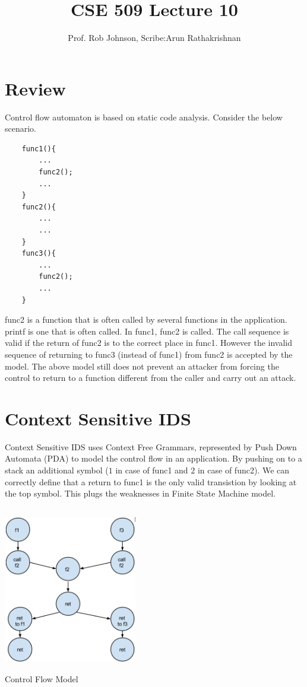 \documentclass[11pt]{article} %
\title{CSE 509 Lecture 10}
\author{Prof. Rob Johnson, Scribe:Arun Rathakrishnan}
\begin{document}
\maketitle
\section {Review}
Control flow automaton is based on static code analysis. Consider the below 
scenario.  

\begin{verbatim}
    func1(){
        ...
        func2();
        ...
    }
    func2(){
        ...
        ...
    }
    func3(){
        ...
        func2();	
        ...
    }
\end{verbatim}


func2 is a function that is often called by several functions in the application.
printf is one that is often called. In func1, func2 is called. The call sequence
is valid if the return of func2 is to the correct place in func1. However the
invalid sequence of returning to func3 (instead of func1) from func2 is accepted
by the model. The above model still does not prevent an attacker from forcing the
control to return to a function different from the caller and carry out an attack.
\section {Context Sensitive IDS}
Context Sensitive IDS  uses Context Free Grammars, represented by Push Down
Automata (PDA) to model the control flow in an application. By pushing on to a
stack an additional symbol ($1$ in case of func1 and $2$ in case of func2). We can
correctly define that a return to func1 is the only valid transistion by looking
at the top symbol. This plugs the weaknesses in Finite State Machine model.

\begin {center}
\includegraphics [width=220px,height=275px]{img/img2.png}\\
\caption{Control Flow Model}
\end {center}
\end{document}
